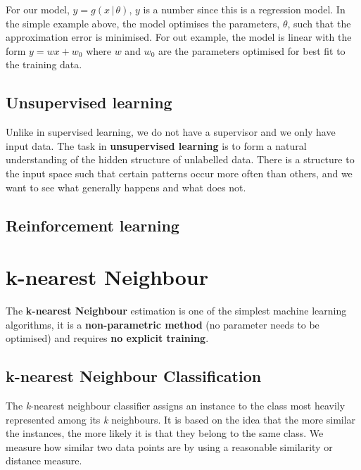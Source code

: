 \documentclass[11pt,fleqn]{book} %
\begin{document}
\noindent
For our model, $y = g(x \, \vert \, \theta)$, $y$ is a number since this is a regression model. In the simple example above, the model optimises the parameters, $\theta$, such that the approximation error is minimised. For out example, the model is linear with the form $y = wx+w_0$ where $w$ and $w_0$ are the parameters optimised for best fit to the training data.

\section{Unsupervised learning}
Unlike in supervised learning, we do not have a supervisor and we only have input data. The task in \textbf{unsupervised learning} is to form a natural understanding of the hidden structure of unlabelled data. There is a structure to the input space such that certain patterns occur more often than others, and we want to see what generally happens and what does not.



\section{Reinforcement learning}



\chapter{k-nearest Neighbour}
The \textbf{k-nearest Neighbour} estimation is one of the simplest machine learning algorithms, it is a \textbf{non-parametric method} (no parameter needs to be optimised) and requires \textbf{no explicit training}.

\section{k-nearest Neighbour Classification}
The \textit{k}-nearest neighbour classifier assigns an instance to the class most heavily represented among its \textit{k} neighbours. It is based on the idea that the more similar the instances, the more likely it is that they belong to the same class. We measure how similar two data points are by using a reasonable similarity or distance measure.\\
\end{document}
